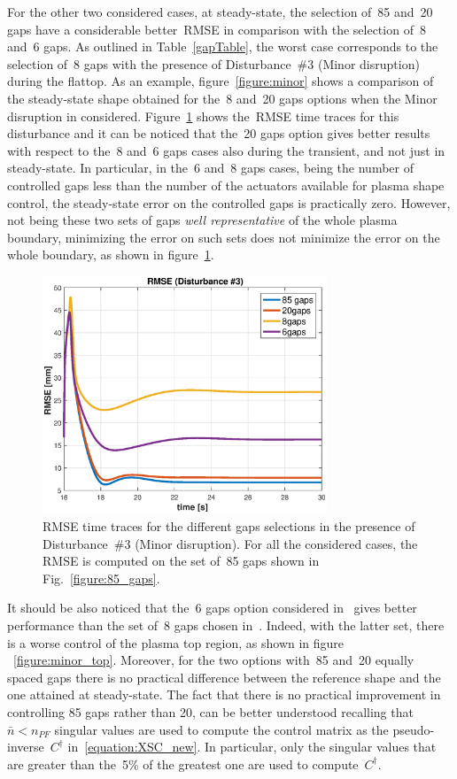 For the other two considered cases, at steady-state, the selection of~85 and~20 gaps have a considerable better~RMSE in comparison with the selection of~8 and~6 gaps. As outlined in Table~\ref{gapTable}, the worst case corresponds to the selection of~8 gaps with the presence of Disturbance~\#3 (Minor disruption) during the flattop. As an example, figure~\ref{figure:minor} shows a comparison of the steady-state shape obtained for the~8 and~20 gaps options when the Minor disruption in considered. Figure~\ref{figure:RMSE} shows the~RMSE time traces for this disturbance and it can be noticed that the~20 gaps option gives better results with respect to the~8 and~6 gaps cases also during the transient, and not just in steady-state.  In particular, in the~6 and~8 gaps cases, being the number of controlled gaps less than the number of the actuators available for plasma shape control, the steady-state error on the controlled gaps is practically zero. However, not being these two sets of gaps \emph{well representative} of the whole plasma boundary, minimizing the error on such sets does not minimize the error on the whole boundary, as shown in figure~\ref{figure:RMSE}.\smallskip

\begin{figure}[!thb]
	\begin{center}
		\includegraphics[width=8.5cm]{Chp3/RMSE_minor.eps}
	\end{center}\caption{RMSE time traces for the different gaps selections in the presence of Disturbance~\#3 (Minor disruption). For all the considered cases, the RMSE is computed on the set of~85 gaps shown in Fig.~\ref{figure:85_gaps}.}\label{figure:RMSE}
\end{figure}

It should be also noticed that the~6 gaps option considered in~\cite{Miyata:2014} gives better performance than the set of~8 gaps chosen in~\cite{miyata2013study}. Indeed, with the latter set, there is a worse control of the plasma top region, as shown in figure ~\ref{figure:minor_top}. Moreover, for the two options with~85 and~20 equally spaced gaps there is no practical difference between the reference shape and the one attained at steady-state. The fact that there is no practical improvement in controlling 85 gaps rather than 20, can be better understood recalling that~$\bar{n}<n_{PF}$ singular values are used to compute the control matrix as the pseudo-inverse~$C^\dag$ in~\eqref{equation:XSC_new}. In particular, only the singular values that are greater than the~5\% of the greatest one are used to compute~$C^\dag$. \smallskip


